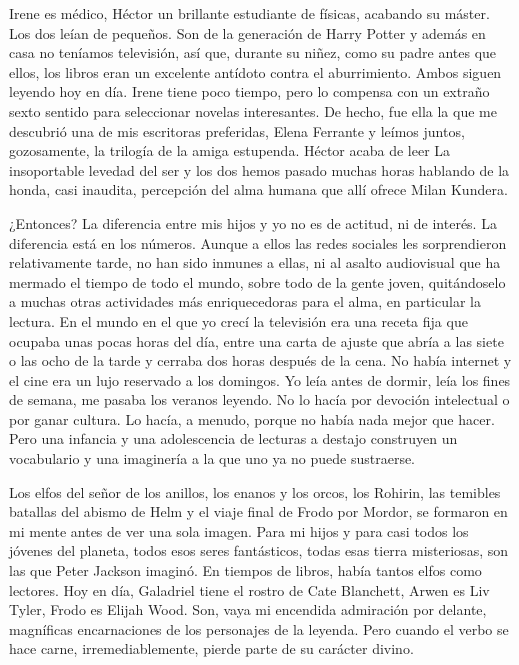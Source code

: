 Irene es médico, Héctor un brillante estudiante de físicas, acabando su máster. Los dos leían de pequeños. Son de la generación de Harry Potter y además en casa no teníamos televisión, así que, durante su niñez, como su padre antes que ellos, los libros eran un excelente antídoto contra el aburrimiento. Ambos siguen leyendo hoy en día. Irene tiene poco tiempo, pero lo compensa con un extraño sexto sentido para seleccionar novelas interesantes. De hecho, fue ella la que me descubrió una de mis escritoras preferidas, Elena Ferrante y leímos juntos, gozosamente, la trilogía de la amiga estupenda. Héctor acaba de leer La insoportable levedad del ser y los dos hemos pasado muchas horas hablando de la honda, casi inaudita, percepción del alma humana que allí ofrece Milan Kundera. 

¿Entonces? La diferencia entre mis hijos y yo no es de actitud, ni de interés. La diferencia está en los números. Aunque a ellos las redes sociales les sorprendieron relativamente tarde, no han sido inmunes a ellas, ni al asalto audiovisual que ha mermado el tiempo de todo el mundo, sobre todo de la gente joven, quitándoselo a muchas otras actividades más enriquecedoras para el alma, en particular la lectura. En el mundo en el que yo crecí la televisión era una receta fija que ocupaba unas pocas horas del día, entre una carta de ajuste que abría a las siete o las ocho de la tarde y cerraba dos horas después de la cena. No había internet y el cine era un lujo reservado a los domingos. Yo leía antes de dormir, leía los fines de semana, me pasaba los veranos leyendo. No lo hacía por devoción intelectual o por ganar cultura. Lo hacía, a menudo, porque no había nada mejor que hacer. Pero una infancia y una adolescencia de lecturas a destajo construyen un vocabulario y una imaginería a la que uno ya no puede sustraerse. 

Los elfos del señor de los anillos, los enanos y los orcos, los Rohirin, las temibles batallas del abismo de Helm y el viaje final de Frodo por Mordor, se formaron en mi mente antes de ver una sola imagen. Para mi hijos y para casi todos los jóvenes del planeta, todos esos seres fantásticos, todas esas tierra misteriosas, son las que Peter Jackson imaginó. En tiempos de libros, había tantos elfos como lectores. Hoy en día, Galadriel tiene el rostro de Cate Blanchett, Arwen es Liv Tyler, Frodo es Elijah Wood. Son, vaya mi encendida admiración por delante, magníficas encarnaciones de los personajes de la leyenda. Pero cuando el verbo se hace carne, irremediablemente, pierde parte de su carácter divino. 

